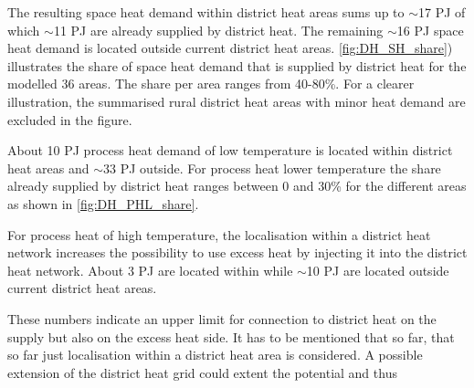 \documentclass[review]{elsarticle}
\begin{document}


The resulting space heat demand within district heat areas sums up to $\sim$17 PJ of which $\sim$11 PJ are already supplied by district heat. The remaining $\sim$16 PJ space heat demand is located outside current district heat areas. \autoref{fig:DH_SH_share}) illustrates the share of space heat demand that is supplied by district heat for the modelled 36 areas. The share per area ranges from 40-80\%. For a clearer illustration, the summarised rural district heat areas with minor heat demand are excluded in the figure.

About 10 PJ process heat demand of low temperature is located within district heat areas and  $\sim$33 PJ outside. For process heat lower temperature the share already supplied by district heat ranges between 0 and 30\% for the different areas as shown in \autoref{fig:DH_PHL_share}.

For process heat of high temperature, the localisation within a district heat network increases the possibility to use excess heat by injecting it into the district heat network. About 3 PJ are located within while $\sim$10 PJ are located outside current district heat areas.

These numbers indicate an upper limit for connection to district heat on the supply but also on the excess heat side. It has to be mentioned that so far, that so far just localisation within a district heat area is considered. A possible extension of the district heat grid could extent the potential and thus
\end{document}
